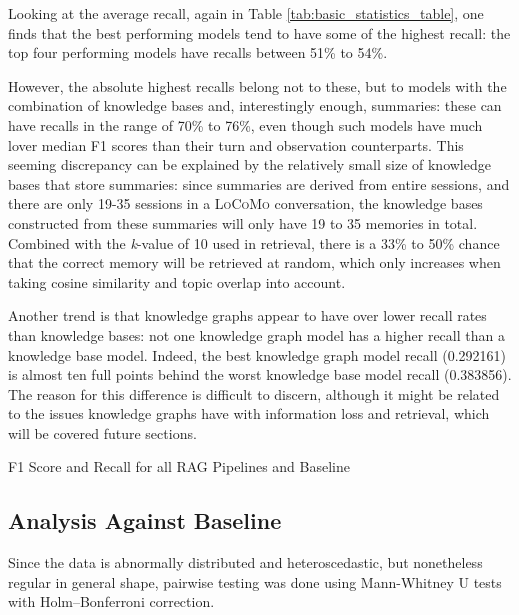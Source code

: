 Looking at the average recall, again in Table \ref{tab:basic_statistics_table}, one finds that the best performing models tend to have some of the highest recall: the top four performing models have recalls between 51\% to 54\%. 

However, the absolute highest recalls belong not to these, but to models with the combination of knowledge bases and, interestingly enough, summaries: these can have recalls in the range of 70\% to 76\%, even though such models have much lover median F1 scores than their turn and observation counterparts. This seeming discrepancy can be explained by the relatively small size of knowledge bases that store summaries: since summaries are derived from entire sessions, and there are only 19-35 sessions in a \textsc{LoCoMo} conversation, the knowledge bases constructed from these summaries will only have 19 to 35 memories in total. Combined with the \textit{k}-value of 10 used in retrieval, there is a 33\% to 50\% chance that the correct memory will be retrieved at random, which only increases when taking cosine similarity and topic overlap into account.

Another trend is that knowledge graphs appear to have over lower recall rates than knowledge bases: not one knowledge graph model has a higher recall than a knowledge base model. Indeed, the best knowledge graph model recall (0.292161) is almost ten full points behind the worst knowledge base model recall (0.383856). The reason for this difference is difficult to discern, although it might be related to the issues knowledge graphs have with information loss and retrieval, which will be covered future sections.

\begin{table}[htbp]
\centering
\scriptsize

\caption{F1 Score and Recall for all RAG Pipelines and Baseline}
\label{tab:basic_statistics_table}
\end{table}



\subsection{Analysis Against Baseline}

Since the data is abnormally distributed and heteroscedastic, but nonetheless regular in general shape, pairwise testing was done using Mann-Whitney U tests with Holm–Bonferroni correction.

